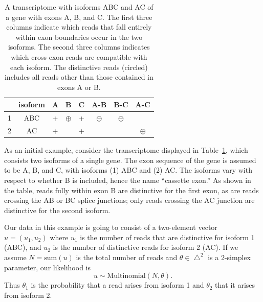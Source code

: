 \documentclass[11pt]{report}
\newcommand{\mycaption}[2]{\caption{#2}\label{#1}}
\begin{document}
\begin{table}
  \centering
  \begin{tabular}{l|c||ccc|ccc|}
     & isoform & A & B & C & A-B & B-C & A-C
    \\ \hline \hline
    1 & ABC  & + & $\oplus$ & + & $\oplus$ & $\oplus$ &                                   
    \\
    2 & AC   & + & & + & & & $\oplus$
  \end{tabular}
  \mycaption{table:abc-experiment1}{A transcriptome with isoforms ABC
    and AC of a gene with exons A, B, and C.  The first three columns
    indicate which reads that fall entirely within exon boundaries
    occur in the two isoforms.  The second three columns indicates
    which cross-exon reads are compatible with each isoform.  The
    distinctive reads (circled) includes all reads other than those
    contained in exons A or B.}
\end{table}
As an initial example, consider the transcriptome displayed in
Table~\ref{table:abc-experiment1}, which consists two isoforms of a
single gene.  The exon sequence of the gene is assumed to be A, B, and
C, with isoforms (1) ABC and (2) AC.  The isoforms vary with respect
to whether B is included, hence the name ``cassette exon.''  As shown
in the table, reads fully within exon B are distinctive for the first
exon, as are reads crossing the AB or BC splice junctions; only reads
crossing the AC junction are distinctive for the second isoform.

Our data in this example is going to consist of a two-element vector
$u = (u_1, u_2)$ where $u_1$ is the number of reads that are
distinctive for isoform 1 (ABC), and $u_2$ is the number of
distinctive reads for isoform 2 (AC).  If we assume $N =
\textrm{sum}(u)$ is the total number of reads and $\theta \in
\bigtriangleup^2$ is a 2-simplex parameter, our likelihood is
\[
  u \sim \textrm{Multinomial}(N, \theta).
\]
Thus $\theta_1$ is the probability that a read arises from isoform 1
and $\theta_2$ that it arises from isoform 2.
\end{document}
